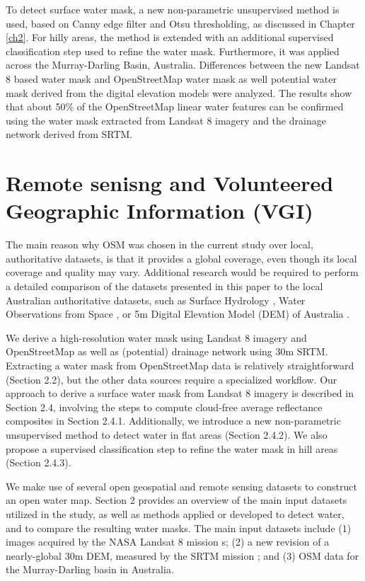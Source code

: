 To detect surface water mask, a new non-parametric unsupervised method is used, based on Canny edge filter and Otsu thresholding, as discussed in Chapter \ref{ch2}. For hilly areas, the method is extended with an additional supervised classification step used to refine the water mask. Furthermore, it was applied across the Murray-Darling Basin, Australia. Differences between the new Landsat 8 based water mask and  OpenStreetMap water mask as well potential water mask derived from the digital elevation models were analyzed. The results show that about 50\% of the OpenStreetMap linear water features can be confirmed using the water mask extracted from Landsat 8 imagery and the drainage network derived from SRTM. 

\section{Remote senisng and Volunteered Geographic Information (VGI)}
The main reason why OSM was chosen in the current study over local, authoritative datasets, is that it provides a global coverage, even though its local coverage and quality may vary. Additional research would be required to perform a detailed comparison of the datasets presented in this paper to the local Australian authoritative datasets, such as Surface Hydrology \citet{CrossmanSLi2015}, Water Observations from Space \citet{Mueller2015}, or 5m Digital Elevation Model (DEM) of Australia \citet{dataAUDEM5m}.

We derive a high-resolution water mask using Landsat 8 imagery and OpenStreetMap as well as (potential) drainage network using 30m SRTM. Extracting a water mask from OpenStreetMap data is relatively straightforward (Section 2.2), but the other data sources require a specialized workflow. Our approach to derive a surface water mask from Landsat 8 imagery is described in Section 2.4, involving the steps to compute cloud-free average reflectance composites in Section 2.4.1. Additionally, we introduce a new non-parametric unsupervised method to detect water in flat areas (Section 2.4.2). We also propose a supervised classification step to refine the water mask in hill areas (Section 2.4.3). 

We make use of several open geospatial and remote sensing datasets to construct an open water map. Section 2 provides an overview of the main input datasets utilized in the study, as well as methods applied or developed to detect water, and to compare the resulting water masks. The main input datasets include (1) images acquired by the NASA Landsat 8 mission \citet{Roy2014}s; (2) a new revision of a nearly-global 30m DEM, measured by the SRTM mission \citet{dataSRTM}; and (3) OSM data for the Murray-Darling basin in Australia. 

